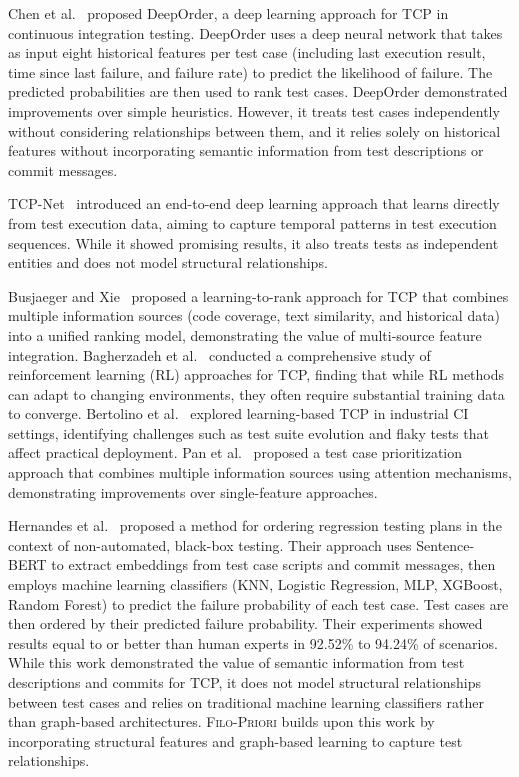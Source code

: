 \documentclass[10pt,journal,compsoc]{IEEEtran}
\newcommand{\filopriori}{\textsc{Filo-Priori}}
\begin{document}
Chen et al.~\cite{chen2023deeporder} proposed DeepOrder, a deep learning approach
for TCP in continuous integration testing. DeepOrder uses a deep neural network
that takes as input eight historical features per test case (including last
execution result, time since last failure, and failure rate) to predict the
likelihood of failure. The predicted probabilities are then used to rank test cases.
DeepOrder demonstrated improvements over simple heuristics. However, it treats
test cases independently without considering relationships between them, and it
relies solely on historical features without incorporating semantic information
from test descriptions or commit messages.

TCP-Net~\cite{abdelkarim2022tcp} introduced an end-to-end deep learning approach
that learns directly from test execution data, aiming to capture temporal patterns
in test execution sequences. While it showed promising results, it also treats
tests as independent entities and does not model structural relationships.

Busjaeger and Xie~\cite{busjaeger2016learning} proposed a learning-to-rank approach
for TCP that combines multiple information sources (code coverage, text similarity,
and historical data) into a unified ranking model, demonstrating the value of
multi-source feature integration.
Bagherzadeh et al.~\cite{bagherzadeh2022reinforcement} conducted a comprehensive
study of reinforcement learning (RL) approaches for TCP, finding that while RL methods
can adapt to changing environments, they often require substantial training data
to converge.
Bertolino et al.~\cite{bertolino2020learning} explored learning-based TCP in
industrial CI settings, identifying challenges such as test suite evolution and
flaky tests that affect practical deployment.
Pan et al.~\cite{pan2022test} proposed a test case prioritization approach that
combines multiple information sources using attention mechanisms, demonstrating
improvements over single-feature approaches.

Hernandes et al.~\cite{hernandes2025method} proposed a method for ordering
regression testing plans in the context of non-automated, black-box testing.
Their approach uses Sentence-BERT to extract embeddings from test case scripts
and commit messages, then employs machine learning classifiers (KNN, Logistic
Regression, MLP, XGBoost, Random Forest) to predict the failure probability of
each test case. Test cases are then ordered by their predicted failure probability.
Their experiments showed results equal to or better than human experts in
92.52\% to 94.24\% of scenarios. While this work demonstrated the value of
semantic information from test descriptions and commits for TCP, it does not
model structural relationships between test cases and relies on traditional
machine learning classifiers rather than graph-based architectures. \filopriori{}
builds upon this work by incorporating structural features and graph-based
learning to capture test relationships.
\end{document}
